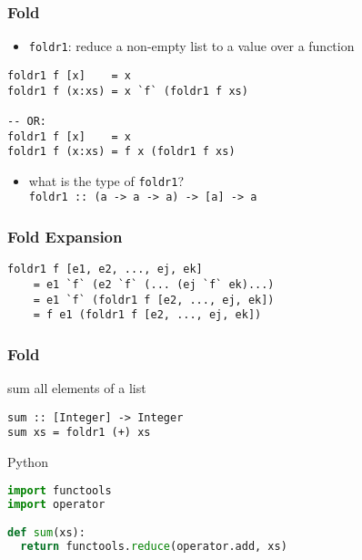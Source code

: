 \documentclass[dvipsnames]{beamer}
\theoremstyle{plain}
\begin{document}
\begin{frame}[fragile]
  \frametitle{Fold}

  \begin{itemize}
    \item \lstinline|foldr1|: reduce a non-empty list to a value over a function
  \end{itemize}

  \begin{exampleblock}{}
    \begin{lstlisting}[deletekeywords={foldr1}]
foldr1 f [x]    = x
foldr1 f (x:xs) = x `f` (foldr1 f xs)

-- OR:
foldr1 f [x]    = x
foldr1 f (x:xs) = f x (foldr1 f xs)
    \end{lstlisting}
  \end{exampleblock}

  \pause
  \begin{itemize}
    \item what is the type of \lstinline|foldr1|?\\
      \lstinline|foldr1 :: (a -> a -> a) -> [a] -> a|
  \end{itemize}
\end{frame}

\begin{frame}[fragile]
  \frametitle{Fold Expansion}

  \begin{block}{}
    \begin{lstlisting}
foldr1 f [e1, e2, ..., ej, ek]
    = e1 `f` (e2 `f` (... (ej `f` ek)...)
    = e1 `f` (foldr1 f [e2, ..., ej, ek])
    = f e1 (foldr1 f [e2, ..., ej, ek])
    \end{lstlisting}
  \end{block}
\end{frame}

\begin{frame}[fragile]
  \frametitle{Fold}

  \begin{exampleblock}{sum all elements of a list}
    \begin{lstlisting}[deletekeywords={sum}]
sum :: [Integer] -> Integer
sum xs = foldr1 (+) xs
    \end{lstlisting}
  \end{exampleblock}

  \bigskip
  \begin{exampleblock}{Python}
    \begin{lstlisting}[language=Python, deletekeywords={reduce, sum}]
import functools
import operator

def sum(xs):
  return functools.reduce(operator.add, xs)
    \end{lstlisting}
  \end{exampleblock}
\end{frame}
\end{document}
